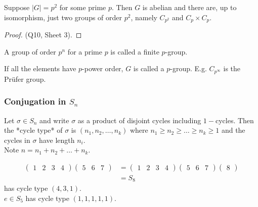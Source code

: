 \begin{corollary}\label{cor:5}
    Suppose $|G| = p^2$ for some prime $p$.
    Then $G$ is abelian and there are, up to isomorphism, just two groups of order $p^2$, namely $C_{p^2}$ and $C_p \times C_p$.
\end{corollary}  

\begin{proof}
    (Q10, Sheet 3).
\end{proof} 

\begin{remark} \mbox{}
    \item A group of order $p^n$ for a prime $p$ is called a finite $p$-group.
    \item If all the elements have $p$-power order, $G$ is called a $p$-group.
    E.g. $C_{p^\infty}$ is the Pr\"ufer group.
\end{remark} 

\subsubsection{Conjugation in $S_n$}

\begin{definition} \label{def:20}
    Let $\sigma \in S_n$ and write $\sigma$ as a product of disjoint cycles including $1-$cycles.
    Then the *cycle type* of $\sigma$ is $(n_1, n_2, \ldots, n_k)$ where $n_1 \geq n_2 \geq \ldots \geq n_k \geq 1$ and the cycles in $\sigma$ have length $n_i$. \\
    Note $n = n_1 + n_2 + \ldots + n_k$.
\end{definition} 

\begin{example}
    \begin{align*}
        \begin{pmatrix}1 & 2 & 3 & 4\end{pmatrix} \begin{pmatrix}5 & 6 & 7\end{pmatrix} &= \begin{pmatrix}1 & 2 & 3 & 4\end{pmatrix} \begin{pmatrix}5 & 6 & 7\end{pmatrix} \begin{pmatrix}8\end{pmatrix} \\
        &= S_8
    \end{align*}
    has cycle type $(4, 3, 1)$. \\
    $e \in S_5$ has cycle type $(1, 1, 1, 1, 1)$.
\end{example} 

